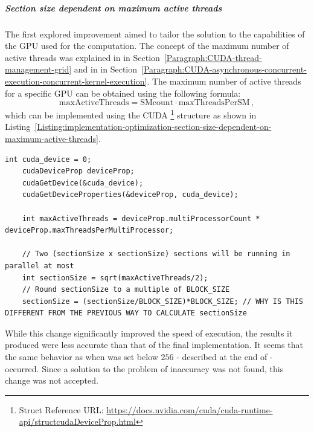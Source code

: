 \subparagraph{Section size dependent on maximum active threads}\label{Subparagraph:implementation-optimization-section-size-dependent-on-maximum-active-threads}
The first explored improvement aimed to tailor the solution to the capabilities of the GPU used for the computation. The concept of the maximum number of active threads was explained in \textit{} in Section~\ref{Paragraph:CUDA-thread-management-grid} and in \textit{} in Section~\ref{Paragraph:CUDA-asynchronous-concurrent-execution-concurrent-kernel-execution}. The maximum number of active threads for a specific GPU can be obtained using the following formula:
\begin{equation}
	\mathrm{maxActiveThreads} = \mathrm{SMcount}\cdot \mathrm{maxThreadsPerSM} \nonumber\,,
\end{equation}
which can be implemented using the CUDA \footnote{ Struct Reference URL: \url{https://docs.nvidia.com/cuda/cuda-runtime-api/structcudaDeviceProp.html}} structure as shown in Listing~\ref{Listing:implementation-optimization-section-size-dependent-on-maximum-active-threads}.

\begin{lstlisting}[caption={Code detailing the calculation of the size of a section based on the the maximum number of active threads for a given GPU. The structure \code{cudaDeviceProp} contains properties and information about the given CUDA device. Taken from the Decomposition project repository on GitLab\protect\footref{Footnote:decomposition-project-gitlab-url}.},label={Listing:implementation-optimization-section-size-dependent-on-maximum-active-threads},escapechar=@]
	int cuda_device = 0;
	cudaDeviceProp deviceProp;
	cudaGetDevice(&cuda_device);
	cudaGetDeviceProperties(&deviceProp, cuda_device);
	
	int maxActiveThreads = deviceProp.multiProcessorCount * deviceProp.maxThreadsPerMultiProcessor;
	
	// Two (sectionSize x sectionSize) sections will be running in parallel at most
	int sectionSize = sqrt(maxActiveThreads/2);
	// Round sectionSize to a multiple of BLOCK_SIZE
	sectionSize = (sectionSize/BLOCK_SIZE)*BLOCK_SIZE; // WHY IS THIS DIFFERENT FROM THE PREVIOUS WAY TO CALCULATE sectionSize
\end{lstlisting}

While this change significantly improved the speed of execution, the results it produced were less accurate than that of the final implementation. It seems that the same behavior as when  was set below $ 256 $ - described at the end of \textit{} - occurred. Since a solution to the problem of inaccuracy was not found, this change was not accepted.

